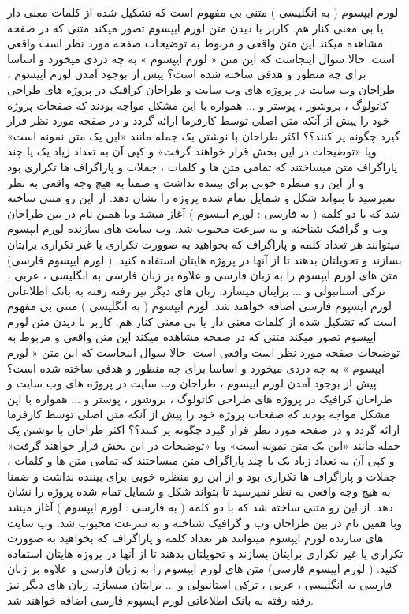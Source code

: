 لورم ایپسوم ( به انگلیسی  ) متنی بی مفهوم است که تشکیل شده از کلمات معنی دار یا بی معنی کنار هم. کاربر با دیدن متن لورم ایپسوم تصور میکند متنی که در صفحه مشاهده میکند این متن واقعی و مربوط به توضیحات صفحه مورد نظر است واقعی است. حالا سوال اینجاست که این متن « لورم ایپسوم » به چه دردی میخورد و اساسا برای چه منظور و هدفی ساخته شده است؟ پیش از بوجود آمدن لورم ایپسوم ، طراحان وب سایت در پروژه های وب سایت و طراحان کرافیک در پروژه های طراحی کاتولوگ ، بروشور ، پوستر و ... همواره با این مشکل مواجه بودند که صفحات پروژه خود را پیش از آنکه متن اصلی توسط کارفرما ارائه گردد و در صفحه مورد نظر قرار گیرد چگونه پر کنند؟؟ اکثر طراحان با نوشتن یک جمله مانند «این یک متن نمونه است» ویا «توضیحات در این بخش قرار خواهند گرفت» و کپی آن به تعداد زیاد یک یا چند پاراگراف متن میساختند که تمامی متن ها و کلمات ، جملات و پاراگراف ها تکراری بود و از این رو منظره خوبی برای بیننده نداشت و ضمنا به هیچ وجه واقعی به نظر نمیرسید تا بتواند شکل و شمایل تمام شده پروژه را نشان دهد. از این رو متنی ساخته شد که با دو کلمه ( به فارسی : لورم ایپسوم ) آغاز میشد وبا همین نام در بین طراحان وب و گرافیک شناخته و به سرعت محبوب شد. وب سایت های سازنده لورم ایپسوم میتوانند هر تعداد کلمه و پاراگراف که بخواهید به صوورت تکراری یا غیر تکراری برایتان بسازند و تحویلتان بدهند تا از آنها در پروژه هایتان استفاده کنید. ( لورم ایپسوم فارسی) متن های لورم ایپسوم را به زبان فارسی و علاوه بر زبان فارسی به انگلیسی ، عربی ، ترکی استانبولی و ... برایتان میسازد. زبان های دیگر نیز رفته رفته به بانک اطلاعاتی لورم ایسپوم فارسی اضافه خواهند شد.  لورم ایپسوم ( به انگلیسی  ) متنی بی مفهوم است که تشکیل شده از کلمات معنی دار یا بی معنی کنار هم. کاربر با دیدن متن لورم ایپسوم تصور میکند متنی که در صفحه مشاهده میکند این متن واقعی و مربوط به توضیحات صفحه مورد نظر است واقعی است. حالا سوال اینجاست که این متن « لورم ایپسوم » به چه دردی میخورد و اساسا برای چه منظور و هدفی ساخته شده است؟ پیش از بوجود آمدن لورم ایپسوم ، طراحان وب سایت در پروژه های وب سایت و طراحان کرافیک در پروژه های طراحی کاتولوگ ، بروشور ، پوستر و ... همواره با این مشکل مواجه بودند که صفحات پروژه خود را پیش از آنکه متن اصلی توسط کارفرما ارائه گردد و در صفحه مورد نظر قرار گیرد چگونه پر کنند؟؟ اکثر طراحان با نوشتن یک جمله مانند «این یک متن نمونه است» ویا «توضیحات در این بخش قرار خواهند گرفت» و کپی آن به تعداد زیاد یک یا چند پاراگراف متن میساختند که تمامی متن ها و کلمات ، جملات و پاراگراف ها تکراری بود و از این رو منظره خوبی برای بیننده نداشت و ضمنا به هیچ وجه واقعی به نظر نمیرسید تا بتواند شکل و شمایل تمام شده پروژه را نشان دهد. از این رو متنی ساخته شد که با دو کلمه ( به فارسی : لورم ایپسوم ) آغاز میشد وبا همین نام در بین طراحان وب و گرافیک شناخته و به سرعت محبوب شد. وب سایت های سازنده لورم ایپسوم میتوانند هر تعداد کلمه و پاراگراف که بخواهید به صوورت تکراری یا غیر تکراری برایتان بسازند و تحویلتان بدهند تا از آنها در پروژه هایتان استفاده کنید. ( لورم ایپسوم فارسی) متن های لورم ایپسوم را به زبان فارسی و علاوه بر زبان فارسی به انگلیسی ، عربی ، ترکی استانبولی و ... برایتان میسازد. زبان های دیگر نیز رفته رفته به بانک اطلاعاتی لورم ایسپوم فارسی اضافه خواهند شد.  

